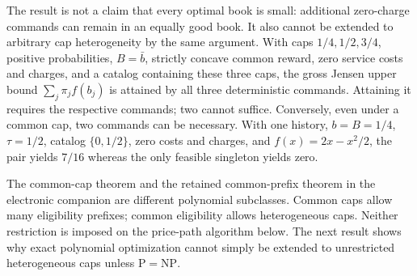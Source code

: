 \documentclass[11pt,letterpaper]{article}
\theoremstyle{definition}\newtheorem{remark}[theorem]{Remark}
\begin{document}
The result is not a claim that every optimal book is small: additional zero-charge commands can remain in an equally good book. It also cannot be extended to arbitrary cap heterogeneity by the same argument. With caps $1/4,1/2,3/4$, positive probabilities, $B=\bar b$, strictly concave common reward, zero service costs and charges, and a catalog containing these three caps, the gross Jensen upper bound $\sum_j\pi_jf(b_j)$ is attained by all three deterministic commands. Attaining it requires the respective commands; two cannot suffice. Conversely, even under a common cap, two commands can be necessary. With one history, $b=B=1/4$, $\tau=1/2$, catalog $\{0,1/2\}$, zero costs and charges, and $f(x)=2x-x^2/2$, the pair yields $7/16$ whereas the only feasible singleton yields zero.

The common-cap theorem and the retained common-prefix theorem in the electronic companion are different polynomial subclasses. Common caps allow many eligibility prefixes; common eligibility allows heterogeneous caps. Neither restriction is imposed on the price-path algorithm below. The next result shows why exact polynomial optimization cannot simply be extended to unrestricted heterogeneous caps unless $\mathrm P=\mathrm{NP}$.
\end{document}
